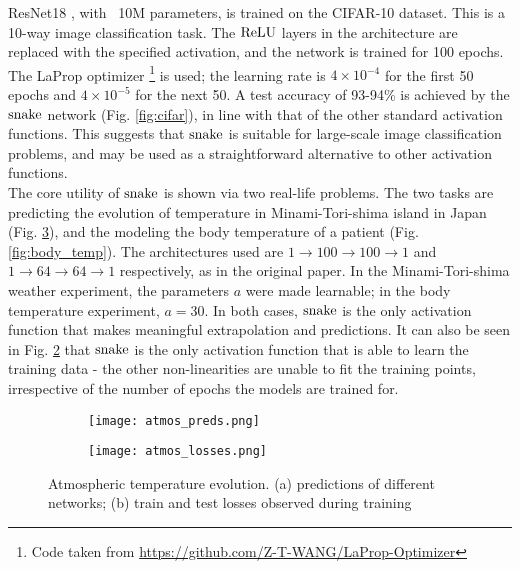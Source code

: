 ResNet18 \cite{7780459}, with ~10M parameters, is trained on the CIFAR-10 dataset. This is a 10-way image classification task. The $ \operatorname{ReLU} $ layers in the architecture are replaced with the specified activation, and the network is trained for 100 epochs. The \rm{LaProp} optimizer \footnote{Code taken from \url{https://github.com/Z-T-WANG/LaProp-Optimizer}} \cite{ziyin2020laprop} is used; the learning rate is $4 \times 10^{-4}$ for the first 50 epochs and $4 \times 10^{-5}$ for the next 50. A test accuracy of 93-94\% is achieved by the $ \operatorname{snake} $ network (Fig. \ref{fig:cifar}), in line with that of the other standard activation functions. This suggests that $ \operatorname{snake} $ is suitable for large-scale image classification problems, and may be used as a straightforward alternative to other activation functions. \\


The core utility of $ \operatorname{snake} $ is shown via two real-life problems. The two tasks are predicting the evolution of temperature in Minami-Tori-shima island in Japan (Fig. \ref{fig:atm}), and the modeling the body temperature of a patient (Fig. \ref{fig:body_temp}). The architectures used are $1\rightarrow100 \rightarrow 100 \rightarrow 1$ and $1 \rightarrow 64 \rightarrow 64 \rightarrow 1$ respectively, as in the original paper. In the Minami-Tori-shima weather experiment, the parameters $a$ were made learnable; in the body temperature experiment, $a = 30$. In both cases, $ \operatorname{snake} $ is the only activation function that makes meaningful extrapolation and predictions. It can also be seen in Fig. \ref{fig:subim2} that $ \operatorname{snake} $ is the only activation function that is able to learn the training data - the other non-linearities are unable to fit the training points, irrespective of the number of epochs the models are trained for. \\


\begin{figure}[h]
  \centering
  \begin{subfigure}{0.45\textwidth}
    \texttt{[image: atmos\_preds.png]} 
  \caption{}
  \label{fig:subim1}
  \end{subfigure}
  \begin{subfigure}{0.45\textwidth}
    \texttt{[image: atmos\_losses.png]}
  \caption{}
  \label{fig:subim2}
  \end{subfigure}

  \caption{Atmospheric temperature evolution. (a) predictions of different networks; (b) train and test losses observed during training}
  \label{fig:atm}
\end{figure}

